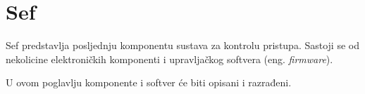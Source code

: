 \chapter{Sef}

Sef predstavlja posljednju komponentu sustava za kontrolu pristupa.
Sastoji se od nekolicine elektroničkih komponenti i upravljačkog softvera (eng. \textit{firmware}).

U ovom poglavlju komponente i softver će biti opisani i razrađeni.
